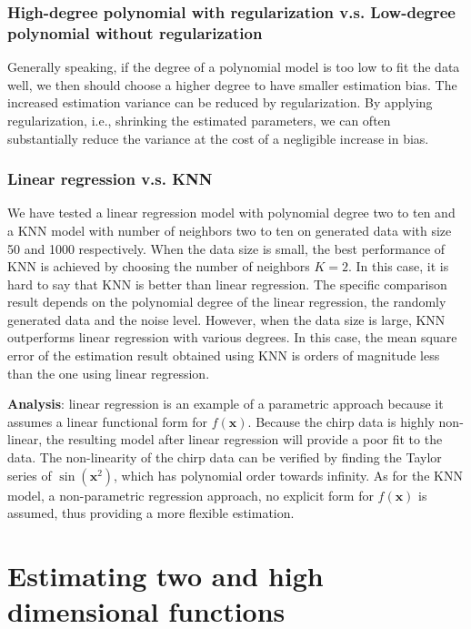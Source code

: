 \documentclass[]{article}
\begin{document}
\subsubsection{High-degree polynomial with regularization v.s. Low-degree polynomial without regularization}

Generally speaking, if the degree of a polynomial model is too low to fit the data well, we then should choose a higher degree to have smaller estimation bias. The increased estimation variance can be reduced by regularization. By applying regularization, i.e., shrinking the estimated parameters, we can often substantially reduce the variance at the cost of a negligible increase in bias. 

\subsubsection{Linear regression v.s. KNN}

We have tested a linear regression model with polynomial degree two to ten and a KNN model with number of neighbors two to ten on generated data with size 50 and 1000 respectively. When the data size is small, the best performance of KNN is achieved by choosing the number of neighbors $K=2$. In this case, it is hard to say that KNN is better than linear regression. The specific comparison result depends on the polynomial degree of the linear regression, the randomly generated data and the noise level. However, when the data size is large, KNN outperforms linear regression with various degrees. In this case, the mean square error of the estimation result obtained using KNN is orders of magnitude less than the one using linear regression. 


\textbf{Analysis}: linear regression is an example of a parametric approach because it assumes a linear functional form for $f(\mathbf{x})$. Because the chirp data is highly non-linear, the resulting model after linear regression will provide a poor fit to the data. The non-linearity of the chirp data can be verified by finding the Taylor series of $\sin(\mathbf{x}^2)$, which has polynomial order towards infinity. As for the KNN model, a non-parametric regression approach, no explicit form for $f(\mathbf{x})$ is assumed, thus providing a more flexible estimation. 


\section{Estimating two and high dimensional functions}
\end{document}
